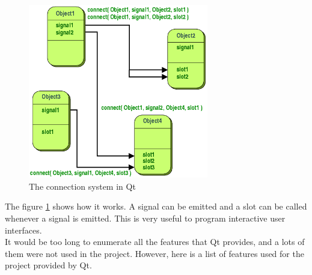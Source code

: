\begin{figure}[H]
	\centering
	\includegraphics[width=0.7\textwidth]{images/abstract-connections.png}
	 \caption{The connection system in Qt}
	 \label{signal-slot-qt}
\end{figure}

The figure \ref{signal-slot-qt} shows how it works. A signal can be emitted and a slot can be called whenever a signal is emitted. This is very useful to program interactive user interfaces.\\
It would be too long to enumerate all the features that Qt provides, and a lots of them were not used in the project. However, here is a list of features used for the project provided by Qt.

